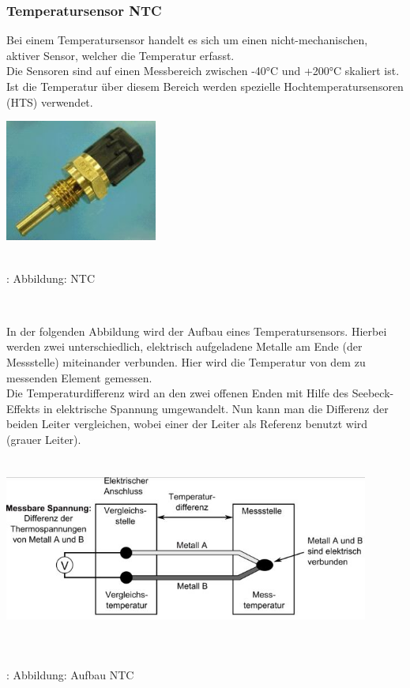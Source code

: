 \documentclass{article}
\begin{document}
			\subsubsection{Temperatursensor NTC}
				\begin{flushleft}
					Bei einem Temperatursensor handelt 
					es sich um einen 
					nicht-mechanischen, aktiver 
					Sensor, welcher die Temperatur 
					erfasst.\\
					Die Sensoren sind auf einen Messbereich zwischen -40°C und +200°C skaliert ist. Ist die Temperatur über diesem Bereich werden spezielle Hochtemperatursensoren (HTS) verwendet.
				\end{flushleft}

				\begin{center}
					\includegraphics[width=5cm, height=4cm] {Images/Kapitel5/ntc.png}
					\caption{\\\cite{TS04}: Abbildung: NTC}
				\end{center}
				\\
			
				\begin{flushleft}
						In der folgenden Abbildung wird der Aufbau eines Temperatursensors. Hierbei werden zwei unterschiedlich, elektrisch aufgeladene Metalle am Ende (der Messstelle) miteinander verbunden. Hier wird die Temperatur von dem zu messenden Element gemessen.\\
						Die Temperaturdifferenz wird an den zwei offenen Enden mit Hilfe des Seebeck-Effekts in elektrische Spannung umgewandelt. Nun kann man die Differenz der beiden Leiter vergleichen, wobei einer der Leiter als Referenz benutzt wird (grauer Leiter).\cite{TS05} 
						
				\end{flushleft}
					
				\begin{center}
					\includegraphics[width=12cm, height=6cm] {Images/Kapitel5/aufbau_ntc.png}
					\caption{\\\cite{TS06}: Abbildung: Aufbau NTC}
				\end{center}
				
\end{document}
